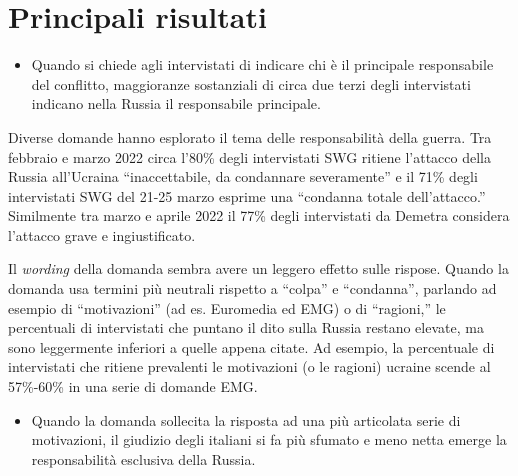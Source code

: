 \documentclass[
]{book}
\providecommand{\tightlist}{%
  \setlength{\itemsep}{0pt}\setlength{\parskip}{0pt}}
\begin{document}
\hypertarget{principali-risultati-1}{%
\section{Principali risultati}\label{principali-risultati-1}}

\begin{itemize}
\tightlist
\item
  Quando si chiede agli intervistati di indicare chi è il principale responsabile del conflitto, maggioranze sostanziali di circa due terzi degli intervistati indicano nella Russia il responsabile principale.
\end{itemize}

Diverse domande hanno esplorato il tema delle responsabilità della guerra. Tra febbraio e marzo 2022 circa l'80\% degli intervistati SWG ritiene l'attacco della Russia all'Ucraina ``inaccettabile, da condannare severamente'' e il 71\% degli intervistati SWG del 21-25 marzo esprime una ``condanna totale dell'attacco.'' Similmente tra marzo e aprile 2022 il 77\% degli intervistati da Demetra considera l'attacco grave e ingiustificato.

Il \emph{wording} della domanda sembra avere un leggero effetto sulle rispose. Quando la domanda usa termini più neutrali rispetto a ``colpa'' e ``condanna'', parlando ad esempio di ``motivazioni'' (ad es. Euromedia ed EMG) o di ``ragioni,'' le percentuali di intervistati che puntano il dito sulla Russia restano elevate, ma sono leggermente inferiori a quelle appena citate. Ad esempio, la percentuale di intervistati che ritiene prevalenti le motivazioni (o le ragioni) ucraine scende al 57\%-60\% in una serie di domande EMG.

\begin{itemize}
\tightlist
\item
  Quando la domanda sollecita la risposta ad una più articolata serie di motivazioni, il giudizio degli italiani si fa più sfumato e meno netta emerge la responsabilità esclusiva della Russia.
\end{itemize}
\end{document}
